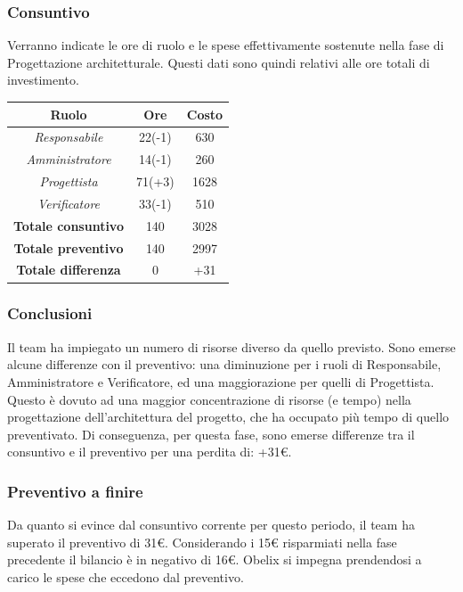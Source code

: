 \subsubsection{Consuntivo}

Verranno indicate le ore di ruolo e le spese effettivamente sostenute nella fase di Progettazione architetturale. Questi dati sono quindi relativi alle ore totali di investimento.

\begin{center}
	\centering
	\begin{tabular}{|c|c|c|}
		\hline
		\textbf{Ruolo} & \textbf{Ore} & \textbf{Costo} \\
		\hline
		\emph{Responsabile}  & 22(-1) & 630 \\
		\hline  \emph{Amministratore}  & 14(-1) & 260 \\
		\hline  \emph{Progettista}  & 71(+3) & 1628 \\
		\hline  \emph{Verificatore}  & 33(-1) & 510 \\
		\hline
		\textbf{Totale consuntivo} & 140 & 3028 \\
		\hline
		\textbf{Totale preventivo} & 140 & 2997 \\
		\hline
		\textbf{Totale differenza} & 0 & +31 \\
		\hline
	\end{tabular}
	
\end{center}

\subsubsection{Conclusioni}

Il team ha impiegato un numero di risorse diverso da quello previsto. Sono emerse alcune differenze con il preventivo: una diminuzione per i ruoli di Responsabile, Amministratore e Verificatore, ed una maggiorazione per quelli di Progettista. Questo è dovuto ad una maggior concentrazione di risorse (e tempo) nella progettazione dell'architettura del progetto, che ha occupato più tempo di quello preventivato.
Di conseguenza, per questa fase, sono emerse differenze tra il consuntivo e il preventivo per una perdita di: +31€.

\subsubsection{Preventivo a finire}
Da quanto si evince dal consuntivo corrente per questo periodo, il team ha superato il preventivo
di 31€. Considerando i 15€ risparmiati nella fase precedente il bilancio è in negativo di 16€. Obelix si impegna prendendosi a carico le spese che eccedono dal preventivo. 

